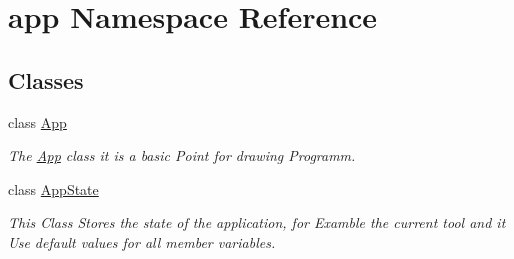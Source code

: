\hypertarget{namespaceapp}{}\section{app Namespace Reference}
\label{namespaceapp}
\subsection*{Classes}
\begin{DoxyCompactItemize}
\item 
class \mbox{\hyperlink{classapp_1_1_app}{App}}
\begin{DoxyCompactList}\small\item\em The \mbox{\hyperlink{classapp_1_1_app}{App}} class it is a basic Point for drawing Programm. \end{DoxyCompactList}\item 
class \mbox{\hyperlink{classapp_1_1_app_state}{App\+State}}
\begin{DoxyCompactList}\small\item\em This Class Stores the state of the application, for Examble the current tool and it Use default values for all member variables. \end{DoxyCompactList}\end{DoxyCompactItemize}
